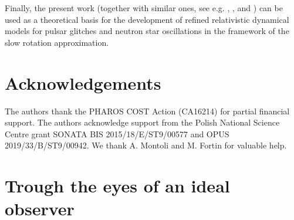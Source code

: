 \documentclass[usenatbib%
]{mnras}
\begin{document}
Finally, the present work (together with similar ones, see e.g. \cite{langlois98}, \cite{andersson_comer2000}, \cite{sourie_glitch2017} and \cite{antonelli+2018}) can be used as a theoretical basis for the development of refined relativistic dynamical models for pulsar glitches and neutron star oscillations in the framework of the slow rotation approximation.  


\section*{Acknowledgements}


The authors thank the PHAROS COST Action (CA16214) for partial financial support.
The authors acknowledge support from the Polish National
Science Centre grant SONATA BIS 2015/18/E/ST9/00577 and OPUS 2019/33/B/ST9/00942.
We thank A. Montoli and M. Fortin for valuable help.

\appendix

\section{Trough the eyes of an ideal observer}\label{misurabile}
\end{document}
